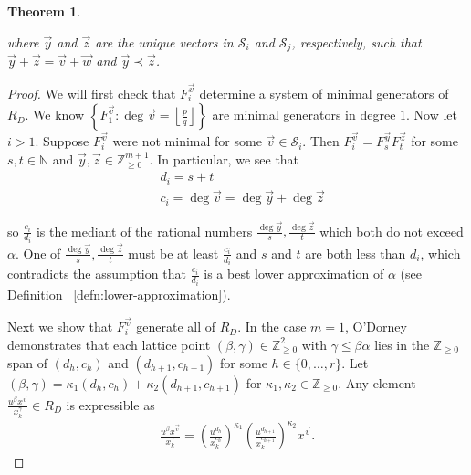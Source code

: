 \documentclass{amsart}
\theoremstyle{plain}
\newtheorem{thm}{Theorem}[section]
\theoremstyle{definition}
\theoremstyle{remark}
\numberwithin{equation}{section}
\newcommand\bn{{\mathbb N}}
\newcommand\bz{{\mathbb Z}}
\newcommand\mss{\mathscr{S}}
\begin{document}
\begin{thm}
\begin{enumerate}
\end{enumerate}

\noindent
where $\vec{y}$ and $\vec{z}$ are the unique
vectors in $\mss_i$ and $\mss_j$, respectively, such that $\vec{y}
+ \vec{z} = \vec{v} + \vec{w}$ and $\vec{y} \prec \vec{z}$.
\end{thm}
\begin{proof}
We will first check that $F^{\vec v}_i$ determine a system of minimal generators of $R_D$. We know $\left\{F_{1}^{\vec{v}} : \deg \vec{v} = \left\lfloor
\frac{p}{q} \right\rfloor \right\}$ are minimal generators in
degree $1$. Now let $i > 1$. Suppose $F_i^{\vec{v}}$ were not
minimal for some $\vec{v} \in \mss_i$. Then $F_i^{\vec{v}} =
F_{s}^{\vec{y}} F_{t}^{\vec{z}}$ for some $s, t \in \bn$ and
$\vec{y}, \vec{z} \in \bz_{ \geq 0}^{m + 1}$. In particular, we see
that 
\begin{align*}
	&d_i = s + t \\
	&c_i = \deg \vec{v} = \deg \vec{y} + \deg \vec{z}
\end{align*}

\noindent
so $\frac{c_i}{d_i}$ is the mediant of the rational numbers
$\frac{\deg \vec{y}}{s}, \frac{\deg \vec{z}}{t}$ which both
do not exceed $\alpha$. One of $\frac{\deg \vec{y}}{s},
\frac{\deg \vec{z}}{t}$ must be at least $\frac{c_i}{d_i}$
and $s$ and $t$ are both less than $d_i$, which contradicts the assumption that $\frac{c_i}{d_i}$ is a best lower approximation of $\alpha$
(see Definition ~\ref{defn:lower-approximation}).

Next we show that $F^{\vec v}_i$ generate all of $R_D$. In the case $m = 1$, O'Dorney \cite[Theorem 6]
{dorney:canonical} demonstrates that each lattice point $(\beta, \gamma) \in
\bz_{\geq 0}^2$ with $\gamma \leq \beta \alpha$ lies in the $\bz_{\geq 0}$ span of $(d_h, c_h)$ and $(d_{h + 1}, c_{h + 1})$ for
some $h \in \{0, \ldots, r\}$. Let $(\beta, \gamma) = \kappa_1
(d_h, c_h) + \kappa_2 (d_{h + 1}, c_{h + 1})$ for $\kappa_1, \kappa_2 \in
\bz_{\geq 0}$. Any element $\frac{u^{\beta}
x^{\vec{v}}} {x_k^{ \gamma}} \in R_D$ is expressible as
\begin{align*}
	\frac{u^{\beta} x^{\vec{v}}} {x_k^{\gamma}} = \left(\frac{u^{d_h}}
	{x_k^{c_h}}\right)^{\kappa_1} \left(\frac{u^{d_{h + 1}}}
	{x_k^{c_{h + 1}}}\right)^{\kappa_2} x^{\vec{v}}.
\end{align*}


\end{proof}
\end{document}
